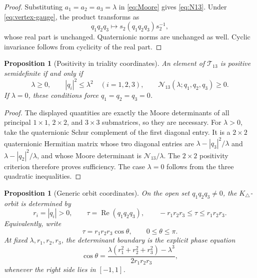 \documentclass[11pt]{article}
\newtheorem{proposition}[theorem]{Proposition}
\theoremstyle{definition}
\theoremstyle{remark}
\newcommand{\Ree}{\operatorname{Re}}
\newcommand{\cT}{\mathcal T}
\newcommand{\cN}{\mathcal N}
\begin{document}
\begin{proof}
Substituting $a_1=a_2=a_3=\lambda$ in \eqref{eq:Moore} gives \eqref{eq:N13}.  Under \eqref{eq:vertex-gauge}, the product transforms as
\[
 q_1q_2q_3\longmapsto
 s_2(q_1q_2q_3)s_2^{-1},
\]
whose real part is unchanged.  Quaternionic norms are unchanged as well.  Cyclic invariance follows from cyclicity of the real part.
\end{proof}

\begin{proposition}[Positivity in triality coordinates]\label{prop:T13-positive}
An element of $\cT_{13}$ is positive semidefinite if and only if
\begin{equation}\label{eq:T13-PSD}
 \lambda\geq0,
 \qquad |q_i|^2\leq\lambda^2\quad(i=1,2,3),
 \qquad \cN_{13}(\lambda;q_1,q_2,q_3)\geq0.
\end{equation}
If $\lambda=0$, these conditions force $q_1=q_2=q_3=0$.
\end{proposition}

\begin{proof}
The displayed quantities are exactly the Moore determinants of all principal $1\times1$, $2\times2$, and $3\times3$ submatrices, so they are necessary.  For $\lambda>0$, take the quaternionic Schur complement of the first diagonal entry.  It is a $2\times2$ quaternionic Hermitian matrix whose two diagonal entries are
$\lambda-|q_3|^2/\lambda$ and $\lambda-|q_2|^2/\lambda$, and whose Moore determinant is $\cN_{13}/\lambda$.  The $2\times2$ positivity criterion therefore proves sufficiency.  The case $\lambda=0$ follows from the three quadratic inequalities.
\end{proof}

\begin{proposition}[Generic orbit coordinates]\label{prop:generic-orbits}
On the open set $q_1q_2q_3\neq0$, the $K_\triangle$-orbit is determined by
\begin{equation}\label{eq:orbit-invariants}
 r_i=|q_i|>0,
 \qquad
 \tau=\Ree(q_1q_2q_3),
 \qquad
 -r_1r_2r_3\leq\tau\leq r_1r_2r_3.
\end{equation}
Equivalently, write
\[
 \tau=r_1r_2r_3\cos\theta,
 \qquad 0\leq\theta\leq\pi.
\]
At fixed $\lambda,r_1,r_2,r_3$, the determinant boundary is the explicit phase equation
\begin{equation}\label{eq:theta-wall}
 \cos\theta
 =\frac{\lambda(r_1^2+r_2^2+r_3^2)-\lambda^3}
        {2r_1r_2r_3},
\end{equation}
whenever the right side lies in $[-1,1]$.
\end{proposition}
\end{document}
